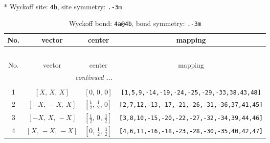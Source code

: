 \documentclass[fleqn,8pt]{jsarticle}
\begin{document}
* Wyckoff site: {\tt 4b}, site symmetry: {\tt .-3m}
\renewcommand{\arraystretch}{1.2}
\begin{longtable}{cccc}
\caption{Wyckoff bond: {\tt 4a@4b}, bond symmetry: {\tt .-3m}}
 \\
 \hline \hline
No. & vector & center & mapping \\ \hline \endfirsthead

\multicolumn{3}{l}{\tablename\ \thetable{}} \\
 \hline \hline
No. & vector & center & mapping \\ \hline \endhead

 \hline \hline
\multicolumn{3}{r}{\footnotesize\it continued ...} \\ \endfoot

 \hline \hline
\multicolumn{3}{r}{} \\ \endlastfoot

1 & $\left[ X,\, X,\, X \right]$ & $\left[ 0,\, 0,\, 0 \right]$ & {\tt [1,5,9,-14,-19,-24,-25,-29,-33,38,43,48]} \\ \hline
2 & $\left[ - X,\, - X,\, X \right]$ & $\left[ \frac{1}{2},\, \frac{1}{2},\, 0 \right]$ & {\tt [2,7,12,-13,-17,-21,-26,-31,-36,37,41,45]} \\ \hline
3 & $\left[ - X,\, X,\, - X \right]$ & $\left[ \frac{1}{2},\, 0,\, \frac{1}{2} \right]$ & {\tt [3,8,10,-15,-20,-22,-27,-32,-34,39,44,46]} \\ \hline
4 & $\left[ X,\, - X,\, - X \right]$ & $\left[ 0,\, \frac{1}{2},\, \frac{1}{2} \right]$ & {\tt [4,6,11,-16,-18,-23,-28,-30,-35,40,42,47]} \\
\end{longtable}
\renewcommand{\arraystretch}{1.2}
\end{document}
